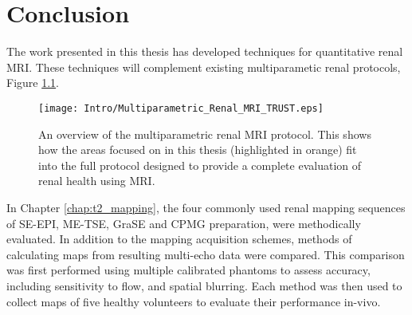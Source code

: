 \chapter{Conclusion}
\label{chap:conclusion}
\newpage
The work presented in this thesis has developed techniques for quantitative renal \ac{MRI}. These techniques will complement existing multiparametic renal protocols, Figure \ref{fig:conc_multi_para_overview}.

\begin{figure}[H]
	\centering
	\texttt{[image: Intro/Multiparametric\_Renal\_MRI\_TRUST.eps]}
	\caption{An overview of the multiparametric renal \ac{MRI} protocol. This shows how the areas focused on in this thesis (highlighted in orange) fit into the full protocol designed to provide a complete evaluation of renal health using \ac{MRI}.}
	\label{fig:conc_multi_para_overview}	
\end{figure}

In Chapter \ref{chap:t2_mapping}, the four commonly used renal \ttwo mapping sequences of \ac{SE}-\ac{EPI}, \ac{ME-TSE}, \ac{GraSE} and \ac{CPMG} \ttwo preparation, were methodically evaluated. In addition to the \ttwo mapping acquisition schemes, methods of calculating \ttwo maps from resulting multi-echo data were compared. This comparison was first performed using multiple calibrated phantoms to assess accuracy, including sensitivity to flow, and spatial blurring. Each method was then used to collect \ttwo maps of five healthy volunteers to evaluate their performance in-vivo. 

